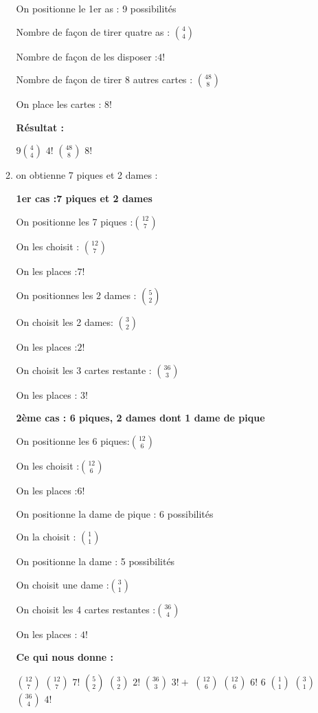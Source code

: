 \documentclass[a4paper,10pt]{article}
\begin{document}
\begin{enumerate}
\begin{enumerate}
		On positionne le 1er as : 9 possibilités
		
		Nombre de façon de tirer quatre as :
		$\binom{ 4}{4}$
		
		Nombre de façon de les disposer :$4!$
		
		Nombre de façon de tirer 8 autres cartes :
		$\binom{48}{8}$
		
		On place les cartes : $8!$
		
		\newpage
		
		\textbf{Résultat :}
		\begin{center}
		$9\binom{4}{4}$
		$4!$
		$\binom{48}{8}$
		$8!$
		\end{center}
		
		\item on obtienne 7 piques et 2 dames :  
		
		\textbf{1er cas :7 piques et 2 dames}
		
		On positionne les 7 piques :$\binom{12}{7}$
		
		On les choisit : $\binom{12}{7} $
		
		On les places :$7!$
		
		On positionnes les 2 dames : 
		$\binom{5}{2}$
		
		On choisit les 2 dames:
		$\binom{3}{2}$
		
		On les places :$2!$
		
		On choisit les 3 cartes restante :
		$\binom{36}{3}$
		
		On les places : $3!$
		
		
		\textbf{2ème cas : 6 piques, 2 dames dont 1 dame de pique}
		
		On positionne les 6 piques:$\binom{12}{6}$
		
		On les choisit :$\binom{12}{6}$
		
		On les places :$6!$
		
		On positionne la dame de pique : 6 possibilités
		
		On la choisit : $\binom{1}{1}$
		
		On positionne la dame : 5 possibilités
		
		On choisit une dame :$\binom{3}{1}$
				
		On choisit les 4 cartes restantes :$\binom{36}{4}$		
		
		On les places : $4!$	
		
		
		\textbf{Ce qui nous donne :}
		
		$\binom{12}{7}$
		$\binom{12}{7}$
		$7!$
		$\binom{5}{2}$
		$\binom{3}{2}$
		$2!$
		$\binom{36}{3}$
		$3!+$
		$\binom{12}{6}$
		$\binom{12}{6}$
		$6!$
		$6$
		$\binom{1}{1}$
		$\binom{3}{1}$
		$\binom{36}{4}$		
		$4!$	
		

\end{enumerate}
\end{enumerate}
\end{document}
